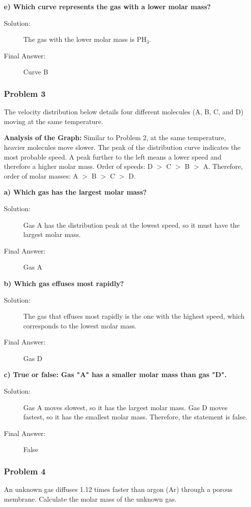 \documentclass{article}
\begin{document}
\textbf{e) Which curve represents the gas with a lower molar mass?}
\begin{description}
    \item[Solution:] The gas with the lower molar mass is PH$_3$.
    \item[Final Answer:] Curve B
\end{description}

\subsubsection{Problem 3}
The velocity distribution below details four different molecules (A, B, C, and D) moving at the same temperature.

\textbf{Analysis of the Graph:}
Similar to Problem 2, at the same temperature, heavier molecules move slower. The peak of the distribution curve indicates the most probable speed. A peak further to the left means a lower speed and therefore a higher molar mass.
Order of speeds: D $>$ C $>$ B $>$ A.
Therefore, order of molar masses: A $>$ B $>$ C $>$ D.

\textbf{a) Which gas has the largest molar mass?}
\begin{description}
    \item[Solution:] Gas A has the distribution peak at the lowest speed, so it must have the largest molar mass.
    \item[Final Answer:] Gas A
\end{description}

\textbf{b) Which gas effuses most rapidly?}
\begin{description}
    \item[Solution:] The gas that effuses most rapidly is the one with the highest speed, which corresponds to the lowest molar mass.
    \item[Final Answer:] Gas D
\end{description}

\textbf{c) True or false: Gas "A" has a smaller molar mass than gas "D".}
\begin{description}
    \item[Solution:] Gas A moves slowest, so it has the largest molar mass. Gas D moves fastest, so it has the smallest molar mass. Therefore, the statement is false.
    \item[Final Answer:] False
\end{description}

\subsubsection{Problem 4}
An unknown gas diffuses 1.12 times faster than argon (Ar) through a porous membrane. Calculate the molar mass of the unknown gas.
\end{document}
